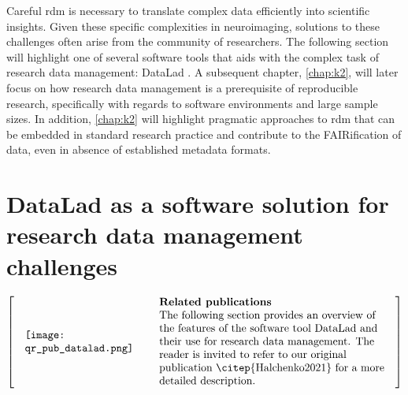 
Careful \gls{rdm} is necessary to translate complex data efficiently into scientific insights.
Given these specific complexities in neuroimaging, solutions to these challenges often arise from the community of researchers.
The following section will highlight one of several software tools that aids with the complex task of research data management: DataLad \citep{Halchenko2021}.
A subsequent chapter, \cref{chap:k2}, will later focus on how research data management is a prerequisite of reproducible research, specifically with regards to software environments and large sample sizes.
In addition, \cref{chap:k2} will highlight pragmatic approaches to \gls{rdm} that can be embedded in standard research practice and contribute to the FAIRification of data, even in absence of established metadata formats.




\section{DataLad as a software solution for research data management challenges}

\[
\left[
\begin{tabular}{@{\quad}m{.3\textwidth}@{\qquad}m{.6\textwidth}@{\quad}}
	\texttt{[image: qr\_pub\_datalad.png]} &
	\raggedright%
	\textbf{Related publications} \par
	The following section provides an overview of the features of the software tool DataLad and their use for research data management.
	The reader is invited to refer to our original publication \citep{Halchenko2021} for a more detailed description.%
\end{tabular}
\right]
\]



